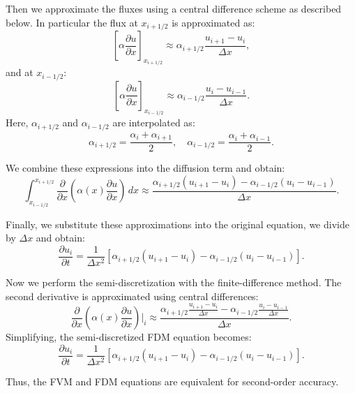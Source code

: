 \documentclass{article}
\begin{document}
Then we approximate the fluxes using a central difference scheme as described below.
In particular the flux at \( x_{i+1/2} \) is approximated as:
\begin{equation}
\left[ \alpha \frac{\partial u}{\partial x} \right]_{x_{i+1/2}} \approx \alpha_{i+1/2} \frac{u_{i+1} - u_i}{\Delta x},
\end{equation}
and at \( x_{i-1/2} \):
\begin{equation}
\left[ \alpha \frac{\partial u}{\partial x} \right]_{x_{i-1/2}} \approx \alpha_{i-1/2} \frac{u_i - u_{i-1}}{\Delta x}.
\end{equation}
Here, \(\alpha_{i+1/2}\) and \(\alpha_{i-1/2}\) are interpolated as:
\begin{equation}
\alpha_{i+1/2} = \frac{\alpha_i + \alpha_{i+1}}{2}, \quad \alpha_{i-1/2} = \frac{\alpha_i + \alpha_{i-1}}{2}.
\end{equation}

We combine these expressions into the diffusion term and obtain:
\begin{equation}
  \int_{x_{i-1/2}}^{x_{i+1/2}} \frac{\partial}{\partial x} \left( \alpha(x) \frac{\partial u}{\partial x} \right) \, dx \approx \frac{\alpha_{i+1/2} (u_{i+1} - u_i) - \alpha_{i-1/2} (u_i - u_{i-1})}{\Delta x}.
  \end{equation}

Finally, we substitute these approximations into the original equation, we divide by \( \Delta x \) and obtain:
\begin{equation}
  \frac{\partial u_i}{\partial t} = \frac{1}{\Delta x^2} \left[ \alpha_{i+1/2} (u_{i+1} - u_i) - \alpha_{i-1/2} (u_i - u_{i-1}) \right].
\end{equation}


Now we perform the semi-discretization with the finite-difference method.
The second derivative is approximated using central differences:
\[
\frac{\partial}{\partial x} \left( \alpha(x) \frac{\partial u}{\partial x} \right) \bigg|_i \approx \frac{\alpha_{i+1/2} \frac{u_{i+1} - u_i}{\Delta x} - \alpha_{i-1/2} \frac{u_i - u_{i-1}}{\Delta x}}{\Delta x}.
\]
Simplifying, the semi-discretized FDM equation becomes:
\begin{equation}
\frac{\partial u_i}{\partial t} = \frac{1}{\Delta x^2} \left[ \alpha_{i+1/2} (u_{i+1} - u_i) - \alpha_{i-1/2} (u_i - u_{i-1}) \right].
\end{equation}

Thus, the FVM and FDM equations are equivalent for second-order accuracy.
\end{document}
